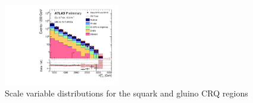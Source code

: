 \begin{figure}[tbp]
\begin{center}
\includegraphics[width=0.45\textwidth]{figures/ATLAS-CONF-2016-078_INT/N-1Plots/AtlasStyle/Preliminary/CRQ_SRJigsawSRS3a_LastCut_CRQ_minusone}
\end{center}
\caption{Scale variable distributions for the squark and gluino CRQ regions}
\label{fig:CRQ_SRJigsawSRG1a_LastCut_CRQ_minusone}
\end{figure}
